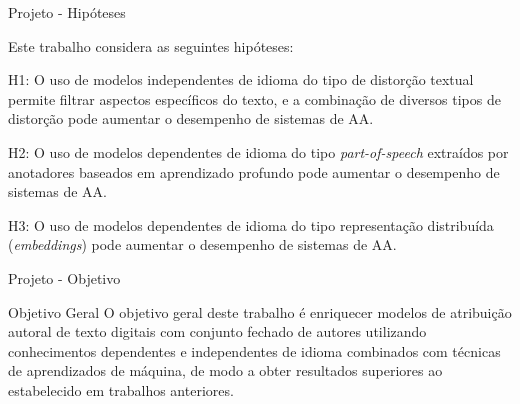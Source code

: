 \begin{frame} {Projeto - Hipóteses}

Este trabalho considera as seguintes hipóteses:

\begin{block}{H1:} O uso de modelos independentes de idioma do tipo de distorção textual permite filtrar aspectos específicos do texto, e a combinação de diversos tipos de distorção pode aumentar o desempenho de sistemas de AA.
\end{block}

\begin{block}{H2:} O uso de modelos dependentes de idioma do tipo {\it part-of-speech} extraídos por anotadores baseados em aprendizado profundo pode aumentar o desempenho de sistemas de AA.
\end{block}


\begin{block}{H3:} O uso de modelos dependentes de idioma do tipo representação distribuída ({\it embeddings}) pode aumentar o desempenho de sistemas de AA.
\end{block}

\end{frame}

\begin{frame}{Projeto - Objetivo}
\begin{block}{Objetivo Geral}
	O objetivo geral deste trabalho é enriquecer modelos de atribuição autoral de texto digitais com conjunto fechado de autores utilizando conhecimentos dependentes e independentes de idioma combinados com técnicas de aprendizados de máquina, de modo a obter resultados superiores ao estabelecido em trabalhos anteriores.
\end{block}
\end{frame}


